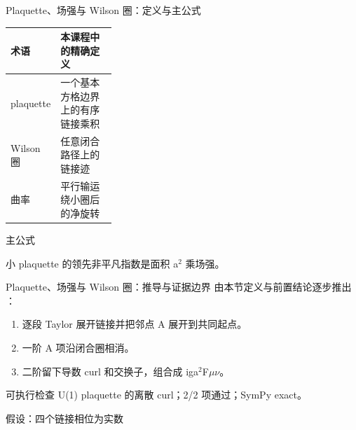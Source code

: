 \begin{frame}[t]{Plaquette、场强与 Wilson 圈：定义与主公式}
\footnotesize\begin{tabularx}{\linewidth}{p{0.30\linewidth}Y}
\toprule 术语 & 本课程中的精确定义\\\midrule
{} plaquette & 一个基本方格边界上的有序链接乘积\\
 Wilson 圈 & 任意闭合路径上的链接迹\\
 曲率 & 平行输运绕小圈后的净旋转\\
\bottomrule\end{tabularx}\vspace{0.15cm}
\begin{block}{ 主公式}\centering{}\end{block}
小 plaquette 的领先非平凡指数是面积 a\ensuremath{^{2}} 乘场强。
\end{frame}

\begin{frame}[t]{Plaquette、场强与 Wilson 圈：推导与证据边界}
\footnotesize
{}\quad 由本节定义与前置结论逐步推出 ：
\begin{enumerate}
\item 逐段 Taylor 展开链接并把邻点 A 展开到共同起点。
\item 一阶 A 项沿闭合圈相消。
\item 二阶留下导数 curl 和交换子，组合成 iga\ensuremath{^{2}}F\ensuremath{\mu}\ensuremath{\nu}。
\end{enumerate}\begin{block}{可执行检查}
\quad U(1) plaquette 的离散 curl；2/2 项通过；SymPy exact。
\par\scriptsize 假设：四个链接相位为实数
\end{block}
\end{frame}

